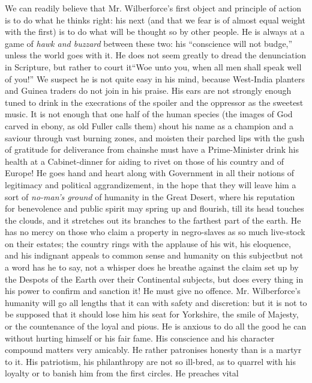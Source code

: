 We can readily believe that Mr. Wilberforce's first object and
principle of action is to do what he thinks right: his next (and
that we fear is of almost equal weight with the first) is to do
what will be thought so by other people. He is always at a game of
\emph{hawk and buzzard} between these two: his ``conscience will
not budge,'' unless the world goes with it. He does not seem
greatly to dread the denunciation in Scripture, but rather to
court it\textemdash ``Woe unto you, when all men shall speak well
of you!'' We suspect he is not quite easy in his mind, because
West-India planters and Guinea traders do not join in his
praise. His ears are not strongly enough tuned to drink in the
execrations of the spoiler and the oppressor as the sweetest
music. It is not enough that one half of the human species (the
images of God carved in ebony, as old Fuller calls them) shout his
name as a champion and a saviour through vast burning zones, and
moisten their parched lips with the gush of gratitude for
deliverance from chains\textemdash he must have a Prime-Minister
drink his health at a Cabinet-dinner for aiding to rivet on those
of his country and of Europe! He goes hand and heart along with
Government in all their notions of legitimacy and political
aggrandizement, in the hope that they will leave him a sort of
\emph{no-man's ground} of humanity in the Great Desert, where his
reputation for benevolence and public spirit may spring up and
flourish, till its head touches the clouds, and it stretches out
its branches to the farthest part of the earth. He has no mercy on
those who claim a property in negro-slaves as so much live-stock
on their estates; the country rings with the applause of his wit,
his eloquence, and his indignant appeals to common sense and
humanity on this subject\textemdash but not a word has he to say,
not a whisper does he breathe against the claim set up by the
Despots of the Earth over their Continental subjects, but does
every thing in his power to confirm and sanction it! He must give
no offence. Mr. Wilberforce's humanity will go all lengths that it
can with safety and discretion: but it is not to be supposed that
it should lose him his seat for Yorkshire, the smile of Majesty,
or the countenance of the loyal and pious. He is anxious to do all
the good he can without hurting himself or his fair fame. His
conscience and his character compound matters very amicably.  He
rather patronises honesty than is a martyr to it. His patriotism,
his philanthropy are not so ill-bred, as to quarrel with his
loyalty or to banish him from the first circles. He preaches vital
